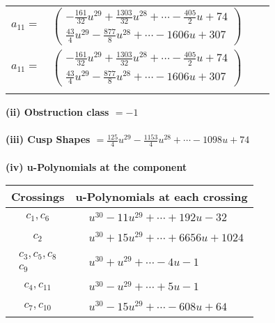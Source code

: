 \documentclass[1p]{elsarticle_modified}
\theoremstyle{definition}
\begin{document}
\begin{tabular}{m{7pt} m{180pt} m{7pt} m{180pt} }
\flushright $a_{11}=$&$\begin{pmatrix}-\frac{161}{32} u^{29}+\frac{1303}{32} u^{28}+\cdots-\frac{405}{2} u+74\\\frac{43}{4} u^{29}-\frac{877}{8} u^{28}+\cdots-1606 u+307\end{pmatrix}$\\ \flushright $a_{11}=$&$\begin{pmatrix}-\frac{161}{32} u^{29}+\frac{1303}{32} u^{28}+\cdots-\frac{405}{2} u+74\\\frac{43}{4} u^{29}-\frac{877}{8} u^{28}+\cdots-1606 u+307\end{pmatrix}$\\&\end{tabular}
\flushleft \textbf{(ii) Obstruction class $= -1$}\\~\\
\flushleft \textbf{(iii) Cusp Shapes $= \frac{125}{4} u^{29}-\frac{1153}{4} u^{28}+\cdots-1098 u+74$}\\~\\
\newpage\renewcommand{\arraystretch}{1}
\flushleft \textbf{(iv) u-Polynomials at the component}\newline \\
\begin{tabular}{m{50pt}|m{274pt}}
Crossings & \hspace{64pt}u-Polynomials at each crossing \\
\hline $$\begin{aligned}c_{1},c_{6}\end{aligned}$$&$\begin{aligned}
&u^{30}-11 u^{29}+\cdots+192 u-32
\end{aligned}$\\
\hline $$\begin{aligned}c_{2}\end{aligned}$$&$\begin{aligned}
&u^{30}+15 u^{29}+\cdots+6656 u+1024
\end{aligned}$\\
\hline $$\begin{aligned}c_{3},c_{5},c_{8}\\c_{9}\end{aligned}$$&$\begin{aligned}
&u^{30}+u^{29}+\cdots-4 u-1
\end{aligned}$\\
\hline $$\begin{aligned}c_{4},c_{11}\end{aligned}$$&$\begin{aligned}
&u^{30}- u^{29}+\cdots+5 u-1
\end{aligned}$\\
\hline $$\begin{aligned}c_{7},c_{10}\end{aligned}$$&$\begin{aligned}
&u^{30}-15 u^{29}+\cdots-608 u+64
\end{aligned}$\\
\hline
\end{tabular}\\~\\
\end{document}
